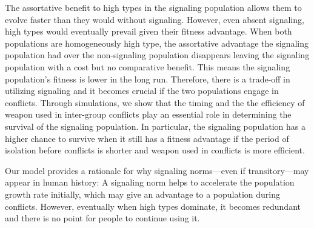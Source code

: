 The assortative benefit to high types in the signaling population allows them to evolve faster than they would without signaling. However, even absent signaling, high types would eventually prevail given their fitness advantage. When both populations are homogeneously high type, the assortative advantage the signaling population had over the non-signaling population disappears leaving the signaling population with a cost but no comparative benefit. This means the signaling population's fitness is lower in the long run.
Therefore, there is a trade-off in utilizing signaling and it becomes crucial if the two populations engage in conflicts. Through simulations, we show that the timing and the the efficiency of weapon used in inter-group conflicts play an essential role in determining the survival of the signaling population. In particular, the signaling population has a higher chance to survive when it still has a fitness advantage if the period of isolation before conflicts is shorter and weapon used in conflicts is more efficient. 

Our model provides a rationale for why signaling norms---even if transitory---may appear in human history: A signaling norm helps to accelerate the population growth rate initially, which may give an advantage to a population during conflicts. However, eventually when high types dominate, it becomes redundant and there is no point for people to continue using it.

